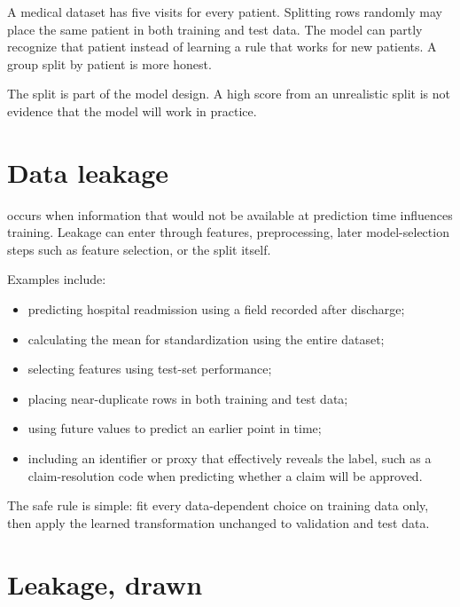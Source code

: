 \begin{workedexample}
A medical dataset has five visits for every patient. Splitting rows randomly may place the same patient in both training and test data. The model can partly recognize that patient instead of learning a rule that works for new patients. A group split by patient is more honest.
\end{workedexample}

\begin{pitfall}
The split is part of the model design. A high score from an unrealistic split is not evidence that the model will work in practice.
\end{pitfall}

\section{Data leakage}
\label{sec:data-leakage}

 occurs when information that would not be available at prediction time influences training. Leakage can enter through features, preprocessing, later model-selection steps such as feature selection, or the split itself.

Examples include:

\begin{itemize}
  \item predicting hospital readmission using a field recorded after discharge;
  \item calculating the mean for standardization using the entire dataset;
  \item selecting features using test-set performance;
  \item placing near-duplicate rows in both training and test data;
  \item using future values to predict an earlier point in time;
  \item including an identifier or proxy that effectively reveals the label, such as a claim-resolution code when predicting whether a claim will be approved.
\end{itemize}

The safe rule is simple: fit every data-dependent choice on training data only, then apply the learned transformation unchanged to validation and test data.

\section{Leakage, drawn}


